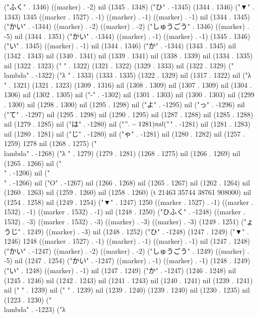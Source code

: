 ("ふく" . 1346) ((marker) . -2) nil (1345 . 1348) ("ひ" . -1345) (1344 . 1346) ("▼" . 1343) 1345 ((marker . 1527) . -1) ((marker) . -1) ((marker) . -1) nil (1344 . 1345) ("かい" . -1344) ((marker) . -2) ((marker) . -2) ("しゅうごう" . 1346) ((marker) . -5) nil (1344 . 1351) ("かい" . -1344) ((marker) . -1) ((marker) . -1) (1345 . 1346) ("い" . 1345) ((marker) . -1) nil (1344 . 1346) ("か" . -1344) (1343 . 1345) nil (1342 . 1343) nil (1340 . 1341) nil (1339 . 1341) nil (1338 . 1339) nil (1334 . 1335) nil (1322 . 1323) (" " . 1322) (1321 . 1322) (1329 . 1333) nil (1322 . 1329) ("\\lambda" . -1322) ("λ
" . 1333) (1333 . 1335) (1322 . 1329) nil (1317 . 1322) nil ("λ
" . 1321) (1321 . 1323) (1309 . 1316) nil (1308 . 1309) nil (1307 . 1309) nil (1304 . 1306) nil (1302 . 1305) nil ("-" . -1302) nil (1301 . 1303) nil (1300 . 1303) nil (1299 . 1300) nil (1298 . 1300) nil (1295 . 1298) nil ("よ" . -1295) nil ("っ" . -1296) nil ("て" . -1297) nil (1295 . 1298) nil (1290 . 1295) nil (1287 . 1288) nil (1285 . 1288) nil (1279 . 1285) nil ("は" . -1280) nil ("$" . -1281) nil ("$" . -1281) nil (1281 . 1283) nil (1280 . 1281) nil ("じ" . -1280) nil ("ゃ" . -1281) nil (1280 . 1282) nil (1257 . 1259) 1278 nil (1268 . 1275) ("\\lambda" . -1268) ("λ
" . 1279) (1279 . 1281) (1268 . 1275) nil (1266 . 1269) nil (1265 . 1266) nil ("\\" . -1206) nil ("\\" . -1266) nil ("O" . -1267) nil (1266 . 1268) nil (1265 . 1267) nil (1262 . 1264) nil (1260 . 1263) nil (1259 . 1260) nil (1258 . 1260) (t 21463 35744 38761 908000) nil (1254 . 1258) nil (1249 . 1254) ("▼" . 1247) 1250 ((marker . 1527) . -1) ((marker . 1532) . -1) ((marker . 1532) . -1) nil (1248 . 1250) ("ひふく" . -1248) ((marker . 1532) . -3) ((marker . 1532) . -3) ((marker) . -3) ((marker) . -3) (1249 . 1251) ("ょうじ" . 1249) ((marker) . -3) nil (1248 . 1252) ("ひ" . -1248) (1247 . 1249) ("▼" . 1246) 1248 ((marker . 1527) . -1) ((marker) . -1) ((marker) . -1) nil (1247 . 1248) ("かい" . -1247) ((marker) . -2) ((marker) . -2) ("しゅうごう" . 1249) ((marker) . -5) nil (1247 . 1254) ("かい" . -1247) ((marker) . -1) ((marker) . -1) (1248 . 1249) ("い" . 1248) ((marker) . -1) nil (1247 . 1249) ("か" . -1247) (1246 . 1248) nil (1245 . 1246) nil (1242 . 1243) nil (1241 . 1243) nil (1240 . 1241) nil (1239 . 1241) nil ("%
" . 1239) nil ("
" . 1239) nil (1239 . 1240) (1239 . 1240) nil (1230 . 1235) nil (1223 . 1230) ("\\lambda" . -1223) ("λ
